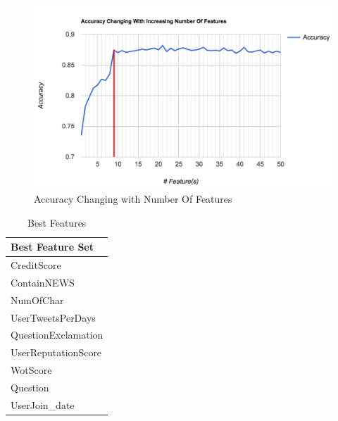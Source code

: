   \begin{figure}[!h]
\centering
\includegraphics[width=\columnwidth]{images/featureseletion.png}
\caption{Accuracy Changing with Number Of Features }
\label{fig:bestfeature}
\end{figure}
 \begin{table}[!h]
\centering
\begin{tabular}{|l|}
\hline

 \textbf{Best Feature Set} \\\hline

 CreditScore \\ ContainNEWS \\

NumOfChar  \\ UserTweetsPerDays\\
QuestionExclamation  \\ UserReputationScore\\ 
 
WotScore  \\ Question\\
UserJoin\_date  \\ \bottomrule 
 \end{tabular}
\caption{Best Features}
\label{bestfeature}
\end{table}
  
